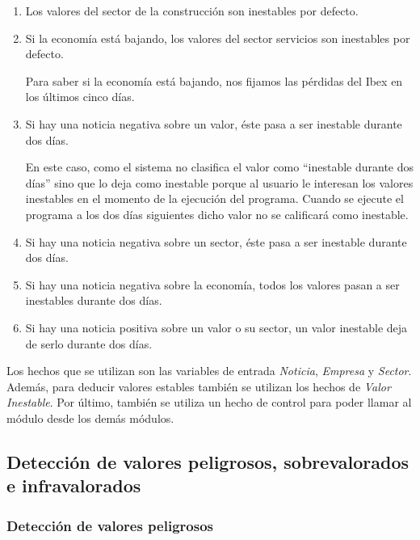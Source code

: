 \documentclass[11pt,openany]{book} %
\begin{document}
\begin{enumerate}[\qquad\color{ocre}{$\bullet$}]
    \item Los valores del sector de la construcción son inestables por defecto.
    \item Si la economía está bajando, los valores del sector servicios son inestables por defecto. 

    Para saber si la economía está bajando, nos fijamos las pérdidas del Ibex en los últimos cinco días.

    \item Si hay una noticia negativa sobre un valor, éste pasa a ser inestable durante dos días.

    En este caso, como el sistema no clasifica el valor como ``inestable durante dos días'' sino que lo deja como inestable porque al usuario le interesan los valores inestables en el momento de la ejecución del programa. Cuando se ejecute el programa a los dos días siguientes dicho valor no se calificará como inestable.

    \item Si hay una noticia negativa sobre un sector, éste pasa a ser inestable durante dos días.

    \item Si hay una noticia negativa sobre la economía, todos los valores pasan a ser inestables durante dos días.

    \item Si hay una noticia positiva sobre un valor o su sector, un valor inestable deja de serlo durante dos días.
\end{enumerate}

Los hechos que se utilizan son las variables de entrada \textit{\textcolor{ocre}{Noticia}}, \textit{\textcolor{ocre}{Empresa}} y \textit{\textcolor{ocre}{Sector}}. Además, para deducir valores estables también se utilizan los hechos de \textit{\textcolor{ocre}{Valor Inestable}}. Por último, también se utiliza un hecho de control para poder llamar al módulo desde los demás módulos.

\subsection{Detección de valores peligrosos, sobrevalorados e infravalorados}

\subsubsection{Detección de valores peligrosos}
\end{document}
